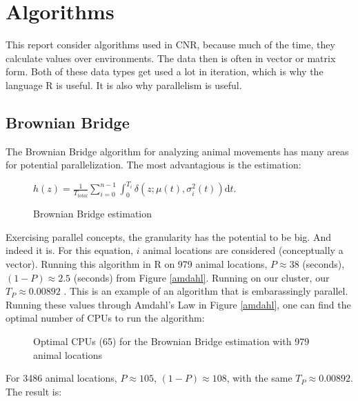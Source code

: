 
\section{Algorithms}
This report consider algorithms used in CNR, because much of the time, they calculate values over 
environments. The data then is often in vector or matrix form. Both of these data types get used a lot in 
iteration, which is why the language R is useful. It is also why parallelism is useful.

\subsection{Brownian Bridge}
The Brownian Bridge algorithm for analyzing animal movements has many areas for potential parallelization.
The most advantagious is the estimation:

\begin{figure}[h!]
        \begin{center}
                $h(z) = \frac{1}{T_{total}} \sum_{i=0}^{n-1} \int_0^{T_i} \! \delta(z; \mu(t),\sigma_i^2(t)) \mathrm{d}t.$
                \caption{Brownian Bridge estimation \cite{bb}}
                \label{bb_est}
        \end{center}
\end{figure}

Exercising parallel concepts, the granularity has the potential to be big. And indeed it is. For this equation,
$i$ animal locations are considered (conceptually a vector). Running this algorithm in R on 979 animal locations,
 $P \approx 38 $ (seconds), $(1 - P) \approx 2.5 $ (seconds) from Figure \ref{amdahl}. Running on our cluster, 
our $T_P \approx 0.00892$ . This is an example of an algorithm that is embarassingly parallel. Running these
values through Amdahl's Law in Figure \ref{amdahl}, one can find the optimal number of CPUs to run 
the algorithm:

\begin{figure}[h!]
        \begin{center}
                \caption{Optimal CPUs (65) for the Brownian Bridge estimation with 979 animal locations}
                \label{opt_cpus_979}
        \end{center}
\end{figure}

\pagebreak

For 3486 animal locations, $P \approx 105$, $(1 - P) \approx 108$, with the same $T_P \approx 0.00892$.
The result is:

